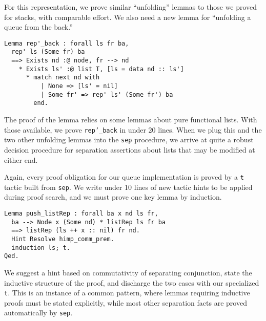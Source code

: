 \documentclass[preprint,nocopyrightspace]{sigplanconf}
\newcommand{\cd}[1]{\texttt{#1}}
\begin{document}
For this representation, we prove similar ``unfolding'' lemmas to those we proved for stacks, with comparable effort.  We also need a new lemma for ``unfolding a queue from the back.''

\begin{verbatim}
Lemma rep'_back : forall ls fr ba,
  rep' ls (Some fr) ba
  ==> Exists nd :@ node, fr --> nd
    * Exists ls' :@ list T, [ls = data nd :: ls']
      * match next nd with
          | None => [ls' = nil]
          | Some fr' => rep' ls' (Some fr') ba
        end.
\end{verbatim}

The proof of the lemma relies on some lemmas about pure functional lists.  With those available, we prove \cd{rep'\_back} in under 20 lines.  When we plug this and the two other unfolding lemmas into the \cd{sep} procedure, we arrive at quite a robust decision procedure for separation assertions about lists that may be modified at either end.

Again, every proof obligation for our queue implementation is proved by a \cd{t} tactic built from \cd{sep}.  We write under 10 lines of new tactic hints to be applied during proof search, and we must prove one key lemma by induction.

\begin{verbatim}
Lemma push_listRep : forall ba x nd ls fr,
  ba --> Node x (Some nd) * listRep ls fr ba
  ==> listRep (ls ++ x :: nil) fr nd.
  Hint Resolve himp_comm_prem.
  induction ls; t.
Qed.
\end{verbatim}

We suggest a hint based on commutativity of separating conjunction, state the inductive structure of the proof, and discharge the two cases with our specialized \cd{t}.  This is an instance of a common pattern, where lemmas requiring inductive proofs must be stated explicitly, while most other separation facts are proved automatically by \cd{sep}.




\end{document}
